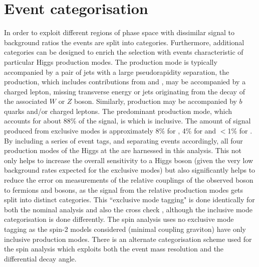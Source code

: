 \section{Event categorisation}
\label{sec:categorisation}

In order to exploit different regions of phase space with dissimilar signal to background ratios the events are split into categories. Furthermore, additional categories can be designed to enrich the selection with events characteristic of particular Higgs production modes. The \VBF production mode is typically accompanied by a pair of jets with a large pseudorapidity separation, the \VH production, which includes contributions from \WH and \ZH, may be accompanied by a charged lepton, missing transverse energy or jets originating from the decay of the associated $W$ or $Z$ boson. Similarly, \ttH production may be accompanied by $b$ quarks and/or charged leptons. The predominant production mode, which accounts for about 88\% of the signal, is \ggH which is inclusive. The amount of signal produced from exclusive modes is approximately 8\% for \VBF, 4\% for \VH and $<$1\% for \ttH. By including a series of event tags, and separating events accordingly, all four production modes of the Higgs at the \LHC are harnessed in this analysis. This not only helps to increase the overall sensitivity to a \SM Higgs boson (given the very low background rates expected for the exclusive modes) but also significantly helps to reduce the error on measurements of the relative couplings of the observed boson to fermions and bosons, as the signal from the relative production modes gets split into distinct categories. This ``exclusive mode tagging" is done identically for both the nominal \MFM analysis and also the cross check \SMVA, although the inclusive mode categorisation is done differently. The \CiC spin analysis uses no exclusive mode tagging as the spin-2 models considered (minimal coupling graviton) have only inclusive production modes. There is an alternate categorisation scheme used for the spin analysis which exploits both the event mass resolution and the differential decay angle. 


